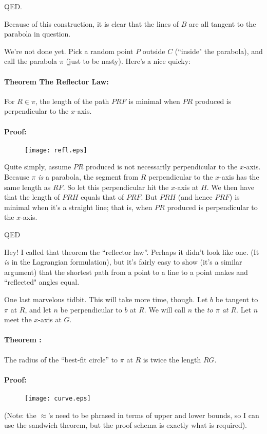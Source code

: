 \documentclass[12pt]{article}
\newcounter{tnum}
\newcommand{\theorem}[1]{\paragraph{Theorem \arabic{tnum} #1:} \addtocounter{tnum}{1}}
\newcommand{\proof}{\paragraph{Proof:}}
\begin{document}
QED.

Because of this construction, it is clear that the lines of $B$ are all tangent to the parabola in question.

We're not done yet.  Pick a random point $P$ outside $C$ (``inside" the parabola), and call the parabola $\pi$ (just to be nasty). Here's a nice quicky:
\theorem{The Reflector Law}
For $R \in \pi$, the length of the path $PRF$ is minimal when $PR$ produced is perpendicular to the $x$-axis.
\proof
\begin{figure}
\begin{center}
\texttt{[image: refl.eps]}
\end{center}
\end{figure}
Quite simply, assume $PR$ produced is not necessarily perpendicular to the $x$-axis.  Because $\pi$ {\em is} a parabola, the segment from $R$ 
perpendicular to the $x$-axis has the same length as $RF$.  So let this perpendicular hit the $x$-axis at $H$.  We then have that the length of $PRH$ 
equals that of $PRF$.  But $PRH$ (and hence $PRF$) is minimal when it's a straight line; that is, when $PR$ produced is perpendicular to the $x$-axis.

QED

Hey! I called that theorem the ``reflector law''.  Perhaps it didn't look like one.  (It {\em is} in the Lagrangian formulation), but it's fairly easy to show (it's a 
similar argument) that the shortest path from a point to a line to a point makes  and ``reflected" angles equal.

One last marvelous tidbit.  This will take more time, though.  Let $b$ be tangent to $\pi$ at $R$, and let $n$ be perpendicular to $b$ at $R$.  We will call 
$n$ the {\em {} to $\pi$ at $R$}.  Let $n$ meet the $x$-axis at $G$.
\theorem{}
The radius of the ``best-fit circle'' to $\pi$ at $R$ is twice the length $RG$.
\proof 
\begin{figure}
\begin{center}
\texttt{[image: curve.eps]}
\end{center}
\end{figure}
(Note: the $\approx$'s need to be phrased in terms of upper and lower bounds, so I can use the sandwich theorem, but the proof schema is exactly what is 
required).
\end{document}
